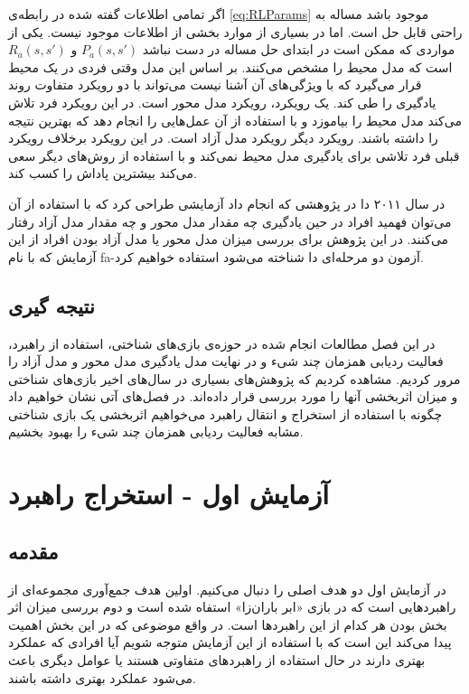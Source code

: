 \documentclass[twoside, a4paper,11pt]{book}
\numberwithin{equation}{chapter}
\numberwithin{table}{chapter}
\numberwithin{figure}{chapter}
\numberwithin{equation}{chapter}
\newcommand{\mls}[1]{\gls{fa-#1}\glsuseri{la-#1}}
\begin{document}
اگر تمامی اطلاعات گفته شده در رابطه‌ی \ref{eq:RLParams} موجود باشد مساله به راحتی قابل حل است. اما در بسیاری از موارد بخشی از اطلاعات موجود نیست. یکی از مواردی که ممکن است در ابتدای حل مساله در دست نباشد $P_a(s, s')$ و $R_a(s, s')$ است که مدل محیط را مشخص می‌کنند. بر اساس این مدل وقتی فردی در یک محیط قرار می‌گیرد که با ویژگی‌های آن آشنا نیست می‌تواند با دو رویکرد متفاوت روند یادگیری را طی کند. یک رویکرد، رویکرد مدل محور است. در این رویکرد فرد تلاش می‌کند مدل محیط را بیاموزد و با استفاده از آن عمل‌هایی را انجام دهد که بهترین نتیجه را داشته باشند. رویکرد دیگر رویکرد مدل آزاد است. در این رویکرد برخلاف رویکرد قبلی فرد تلاشی برای یادگیری مدل محیط نمی‌کند و با استفاده از روش‌های دیگر سعی می‌کند بیشترین پاداش را کسب کند.

در سال ۲۰۱۱ دا در پژوهشی که انجام داد \cite{daw2011ModelBased} آزمایشی طراحی کرد که با استفاده از آن می‌توان فهمید افراد در حین یادگیری چه مقدار مدل محور و چه مقدار مدل آزاد رفتار می‌کنند. در این پژوهش برای بررسی میزان مدل محور یا مدل آزاد بودن افراد از این آزمایش که با نام \mls{آزمون دو مرحله‌ای دا} شناخته می‌شود استفاده خواهیم کرد.

\section{نتیجه گیری}

در این فصل مطالعات انجام شده در حوزه‌ی بازی‌های شناختی، استفاده از راهبرد، فعالیت ردیابی همزمان چند شیء و در نهایت مدل یادگیری مدل محور و مدل آزاد را مرور کردیم. مشاهده کردیم که پژوهش‌های بسیاری در سال‌های اخیر بازی‌های شناختی و میزان اثربخشی آنها را مورد بررسی قرار داده‌اند. در فصل‌های آتی نشان خواهیم داد چگونه با استفاده از استخراج و انتقال راهبرد می‌خواهیم اثربخشی یک بازی شناختی مشابه فعالیت ردیابی همزمان چند شیء را بهبود بخشیم.



\chapter{آزمایش اول - استخراج راهبرد}
\label{chapter:partOneExtraction}
\thispagestyle{plain}

\section{مقدمه}
در آزمایش اول دو هدف اصلی را دنبال می‌کنیم. اولین هدف جمع‌آوری مجموعه‌ای از راهبردهایی است که در بازی «ابر باران‌زا» استفاه شده است و دوم بررسی میزان اثر بخش بودن هر کدام از این راهبردها است. در واقع موضوعی که در این بخش اهمیت پیدا می‌کند این است که با استفاده از این آزمایش متوجه شویم آیا افرادی که عملکرد بهتری دارند در حال استفاده از راهبردهای متفاوتی هستند یا عوامل دیگری باعث می‌شود عملکرد بهتری داشته باشند.
\end{document}
